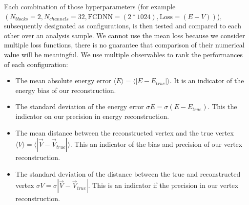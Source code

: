 Each combination of those hyperparameters (for example $(N_{blocks} = 2, N_{channels} = 32, \mathrm{FCDNN} = (2 * 1024), \mathrm{Loss} = (E+V))$), subsequently designated as configurations, is then tested and compared to each other over an analysis sample. We cannot use the mean loss because we consider multiple loss functions, there is no guarantee that comparison of their numerical value will be meaningful. We use multiple observables to rank the performances of each configuration:
\begin{itemize}
  \item The mean absolute energy error $\langle E \rangle = \langle | E - E_{true} | \rangle$. It is an indicator of the energy bias of our reconstruction.
  \item The standard deviation of the energy error $\sigma E = \sigma (E - E_{true})$. This the indicator on our precision in energy reconstruction.
  \item The mean distance between the reconstructed vertex and the true vertex $\langle V \rangle = \langle | \vec{V} - \vec{V}_{true} | \rangle$. This an indicator of the bias and precision of our vertex reconstruction.
  \item The standard deviation of the distance between the true and reconstructed vertex $\sigma V = \sigma |\vec{V} - \vec{V}_{true}|$. This is an indicator if the precision in our vertex reconstruction.
\end{itemize}




